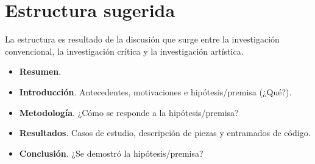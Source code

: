 \section*{Estructura sugerida}

La estructura es resultado de la discusión que surge entre la investigación convencional, la investigación crítica y la investigación artística. 

\begin{itemize}

\item \textbf{Resumen}.
\item \textbf{Introducción}. Antecedentes, motivaciones e hipótesis/premisa (¿Qué?).
\item \textbf{Metodología}. ¿Cómo se responde a la hipótesis/premisa?
\item \textbf{Resultados}. Casos de estudio, descripción de piezas y entramados de código.
\item \textbf{Conclusión}. ¿Se demostró la hipótesis/premisa? 
  
\end{itemize}
